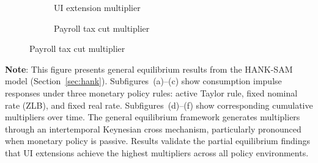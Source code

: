 \documentclass[\latexroot/\projectname]{subfiles}
\begin{document}
\begin{figure}[H]
\begin{minipage}{\textwidth}
\begin{subfigure}[b]{.30\linewidth}
      \caption{UI extension multiplier}
      \whenintegrated{\label{fig:HANK_UI_multiplier}} %
    \end{subfigure}
    \begin{subfigure}[b]{.30\linewidth}
      \centering
      \caption{Payroll tax cut multiplier}
      \whenintegrated{\label{fig:HANK_tax_multiplier}} %
    \end{subfigure}
  \end{minipage}
\end{figure}
\noindent\parbox{\textwidth}{\footnotesize
  \textbf{Note}: This figure presents general equilibrium results from the HANK-SAM model (Section~\ref{sec:hank}).
  Subfigures~(a)--(c) show consumption impulse responses under three monetary policy rules:
  active Taylor rule, fixed nominal rate (ZLB), and fixed real rate.
  Subfigures~(d)--(f) show corresponding cumulative multipliers over time.
  The general equilibrium framework generates multipliers through an intertemporal Keynesian cross mechanism,
  particularly pronounced when monetary policy is passive.
  Results validate the partial equilibrium findings that UI extensions achieve the highest multipliers
  across all policy environments.
}

\vspace{1em}  %

\smartbib
\end{document}
